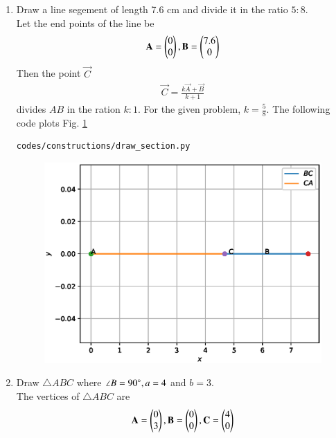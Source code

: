\renewcommand{\theequation}{\theenumi}
\begin{enumerate}[label=\arabic*.,ref=\thesubsection.\theenumi]

\item Draw a line segement of length 7.6 cm and divide it in the ratio $5:8$.
\\
\solution Let the end points of the line be 
\begin{align}
\mathbf{A} = \begin{pmatrix}0\\0\end{pmatrix}, \mathbf{B} = \begin{pmatrix}7.6\\0\end{pmatrix}
\end{align}
Then the point $\vec{C}$
\begin{align}
\vec{C} = \frac{k \vec{A} + \vec{B}}{k+1}
\end{align}
divides $AB$ in the ration $k:1$. For the given problem, $k = \frac{5}{8}$.
The following code plots Fig. \ref{fig:section}
\begin{lstlisting}
codes/constructions/draw_section.py
\end{lstlisting}
\begin{figure}[!ht]
\includegraphics[width=\columnwidth]{./constructions/figs/section.eps}
\caption{}
\label{fig:section}
\end{figure}
\item Draw $\triangle ABC$ where $\angle B = 90\degree, a = 4$ and $b = 3$.
\\
\solution The vertices of $\triangle ABC$ are 
\begin{align}
\vec{A} = \myvec{0\\3}, \vec{B} = \myvec{0\\0}, \vec{C} = \myvec{4\\0}

\end{align}
\end{enumerate}
